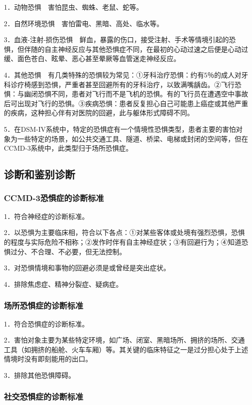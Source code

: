 1．动物恐惧　害怕昆虫、蜘蛛、老鼠、蛇等。

2．自然环境恐惧　害怕雷电、黑暗、高处、临水等。

3．血液-注射-损伤恐惧　鲜血，暴露的伤口，接受注射、手术等情境引起的恐惧，但伴随的自主神经反应与其他恐惧症不同，在最初的心动过速之后便是心动过缓、面色苍白、眩晕、恶心甚至晕厥等血管迷走神经反应。

4．其他恐惧　有几类特殊的恐惧较为常见：①牙科治疗恐惧：约有5％的成人对牙科诊疗椅感到恐惧，严重者甚至回避所有的牙科治疗，以致满嘴龋齿。②飞行恐惧：与幽闭恐惧不同，患者对飞行而不是飞机的恐惧。有的飞行员在遭遇空中事故后可出现对飞行的恐惧。③疾病恐惧：患者反复担心自己可能患上癌症或其他严重的疾病，这种担心伴有对医院的回避，此与躯体形式障碍不同。

5．在DSM-IV系统中，特定的恐惧症有一个情境性恐惧类型，患者主要的害怕对象为一些特定的场景，如公共交通工具、隧道、桥梁、电梯或封闭的空间等，但在CCMD-3系统中，此类型归于场所恐惧症。

\subsection{诊断和鉴别诊断}

\subsubsection{CCMD-3恐惧症的诊断标准}

1．符合神经症的诊断标准。

2．以恐惧为主要临床相，符合以下各点：①对某些客体或处境有强烈恐惧，恐惧的程度与实际危险不相称；②发作时伴有自主神经症状；③有回避行为；④知道恐惧过分、不合理、不必要，但无法控制。

3．对恐惧情境和事物的回避必须是或曾经是突出症状。

4．排除焦虑症、精神分裂症、疑病症。

\subsubsection{场所恐惧症的诊断标准}

1．符合恐惧症的诊断标准。

2．害怕对象主要为某些特定环境，如广场、闭室、黑暗场所、拥挤的场所、交通工具（如拥挤的船舱、火车车厢）等。其关键的临床特征之一是过分担心处于上述情境时没有即刻能用的出口。

3．排除其他恐惧障碍。

\subsubsection{社交恐惧症的诊断标准}

